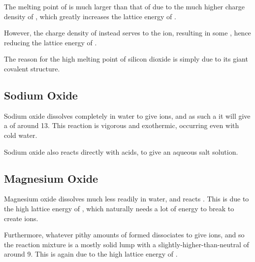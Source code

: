 			The melting point of  is much larger than that of  due to the much higher charge density of , which
			greatly increases the lattice energy of .

			However, the  charge density of  instead serves to  the  ion, resulting
			in some , hence reducing the lattice energy of .

			The reason for the high melting point of silicon dioxide is simply due to its giant covalent structure.



		\pagebreak
		\subsection{Sodium Oxide}

			Sodium oxide dissolves completely in water to give  ions, and as such a it will give a \pH{} of around \num{13}. This
			reaction is vigorous and exothermic, occurring even with cold water.

			Sodium oxide also reacts directly with acids, to give an aqueous salt solution.




		\subsection{Magnesium Oxide}

			Magnesium oxide dissolves much less readily in water, and reacts . This is due to the high lattice energy of
			, which naturally needs a lot of energy to break to create ions.

			Furthermore, whatever pithy amounts of  formed  dissociates to give  ions, and so the reaction
			mixture is a mostly solid lump with a slightly-higher-than-neutral \pH{} of around \num{9}. This is again due to the high lattice
			energy of .


